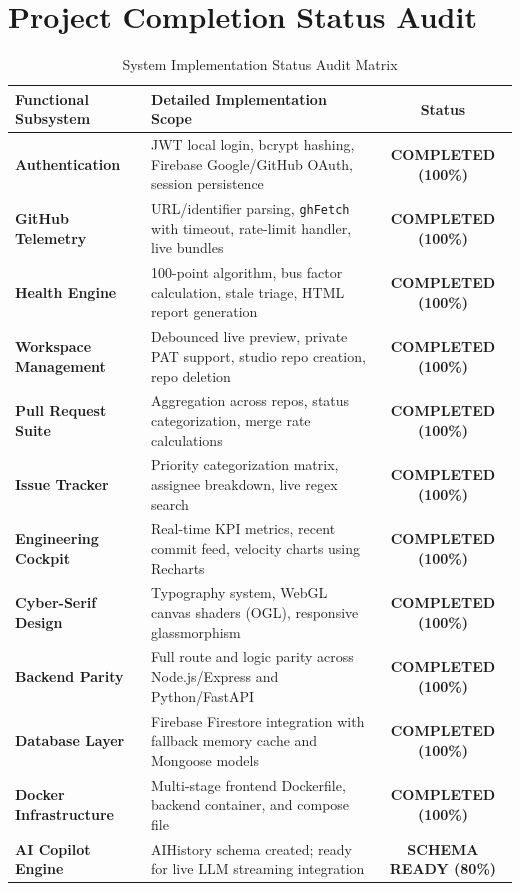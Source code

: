 \documentclass[11pt,a4paper]{article}
\begin{document}
\section{Project Completion Status Audit}

\begin{table}[htbp]
\centering
\small
\begin{tabularx}{\textwidth}{l X c}
\toprule
\textbf{Functional Subsystem} & \textbf{Detailed Implementation Scope} & \textbf{Status} \\
\midrule
\textbf{Authentication} & JWT local login, bcrypt hashing, Firebase Google/GitHub OAuth, session persistence & \textcolor{secondary}{\textbf{COMPLETED (100\%)}} \\
\addlinespace
\textbf{GitHub Telemetry} & URL/identifier parsing, \texttt{ghFetch} with timeout, rate-limit handler, live bundles & \textcolor{secondary}{\textbf{COMPLETED (100\%)}} \\
\addlinespace
\textbf{Health Engine} & 100-point algorithm, bus factor calculation, stale triage, HTML report generation & \textcolor{secondary}{\textbf{COMPLETED (100\%)}} \\
\addlinespace
\textbf{Workspace Management} & Debounced live preview, private PAT support, studio repo creation, repo deletion & \textcolor{secondary}{\textbf{COMPLETED (100\%)}} \\
\addlinespace
\textbf{Pull Request Suite} & Aggregation across repos, status categorization, merge rate calculations & \textcolor{secondary}{\textbf{COMPLETED (100\%)}} \\
\addlinespace
\textbf{Issue Tracker} & Priority categorization matrix, assignee breakdown, live regex search & \textcolor{secondary}{\textbf{COMPLETED (100\%)}} \\
\addlinespace
\textbf{Engineering Cockpit} & Real-time KPI metrics, recent commit feed, velocity charts using Recharts & \textcolor{secondary}{\textbf{COMPLETED (100\%)}} \\
\addlinespace
\textbf{Cyber-Serif Design} & Typography system, WebGL canvas shaders (OGL), responsive glassmorphism & \textcolor{secondary}{\textbf{COMPLETED (100\%)}} \\
\addlinespace
\textbf{Backend Parity} & Full route and logic parity across Node.js/Express and Python/FastAPI & \textcolor{secondary}{\textbf{COMPLETED (100\%)}} \\
\addlinespace
\textbf{Database Layer} & Firebase Firestore integration with fallback memory cache and Mongoose models & \textcolor{secondary}{\textbf{COMPLETED (100\%)}} \\
\addlinespace
\textbf{Docker Infrastructure} & Multi-stage frontend Dockerfile, backend container, and compose file & \textcolor{secondary}{\textbf{COMPLETED (100\%)}} \\
\addlinespace
\textbf{AI Copilot Engine} & AIHistory schema created; ready for live LLM streaming integration & \textcolor{primary}{\textbf{SCHEMA READY (80\%)}} \\
\bottomrule
\end{tabularx}
\caption{System Implementation Status Audit Matrix}
\end{table}
\end{document}
